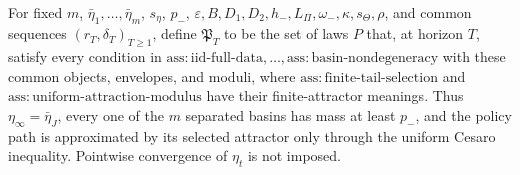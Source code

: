 For fixed \(m\), \(\bar\eta_1,\ldots,\bar\eta_m\), \(s_\eta\), \(p_-\), \(\varepsilon,B,D_1,D_2,h_-,L_\Pi,\omega_-,\kappa,s_\Theta,\rho\), and common sequences \((r_T,\delta_T)_{T\ge1}\), define \(\mathfrak P_T\) to be the set of laws \(P\) that, at horizon \(T\), satisfy every condition in \(\mathrm{ass:iid\text{-}full\text{-}data},\ldots,\mathrm{ass:basin\text{-}nondegeneracy}\) with these common objects, envelopes, and moduli, where \(\mathrm{ass:finite\text{-}tail\text{-}selection}\) and \(\mathrm{ass:uniform\text{-}attraction\text{-}modulus}\) have their finite-attractor meanings. Thus \(\eta_\infty=\bar\eta_J\), every one of the \(m\) separated basins has mass at least \(p_-\), and the policy path is approximated by its selected attractor only through the uniform Cesaro inequality. Pointwise convergence of \(\eta_t\) is not imposed.